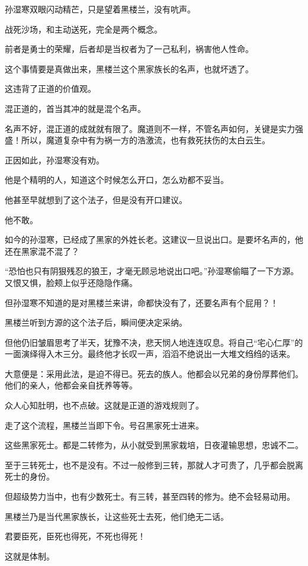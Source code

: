 \begin{this_body}
孙湿寒双眼闪动精芒，只是望着黑楼兰，没有吭声。

战死沙场，和主动送死，完全是两个概念。

前者是勇士的荣耀，后者却是当权者为了一己私利，祸害他人性命。

这个事情要是真做出来，黑楼兰这个黑家族长的名声，也就坏透了。

这违背了正道的价值观。

混正道的，首当其冲的就是混个名声。

名声不好，混正道的成就就有限了。魔道则不一样，不管名声如何，关键是实力强盛！所以，魔道复杂中有为祸一方的浩激流，也有救死扶伤的太白云生。

正因如此，孙湿寒没有劝。

他是个精明的人，知道这个时候怎么开口，怎么劝都不妥当。

他甚至早就想到了这个法子，但是没有开口建议。

他不敢。

如今的孙湿寒，已经成了黑家的外姓长老。这建议一旦说出口。是要坏名声的，他还在黑家混不混了？

“恐怕也只有阴狠残忍的狼王，才毫无顾忌地说出口吧。”孙湿寒偷瞄了一下方源。又恨又惧，脸颊上似乎还隐隐作痛。

但孙湿寒不知道的是对黑楼兰来讲，命都快没有了，还要名声有个屁用？！

黑楼兰听到方源的这个法子后，瞬间便决定采纳。

但他仍旧皱眉思考了半天，犹豫不决，悲天悯人地连连叹息。将自己“宅心仁厚”的一面演绎得入木三分。最终他才长叹一声，滔滔不绝说出一大堆文绉绉的话来。

大意便是：采用此法，是迫不得已。死去的族人。他都会以兄弟的身份厚葬他们。他们的亲人，他都会亲自抚养等等。

众人心知肚明，也不点破。这就是正道的游戏规则了。

走了这个流程，黑楼兰当即下令。号召黑家死士进来。

这些黑家死士。都是二转修为，从小就受到黑家栽培，日夜灌输思想，忠诚不二。

至于三转死士，也不是没有。不过一般修到三转，那就人才可贵了，几乎都会脱离死士的身份。

但超级势力当中，也有少数死士。有三转，甚至四转的修为。绝不会轻易动用。

黑楼兰乃是当代黑家族长，让这些死士去死，他们绝无二话。

君要臣死，臣死也得死，不死也得死！

这就是体制。


\end{this_body}

